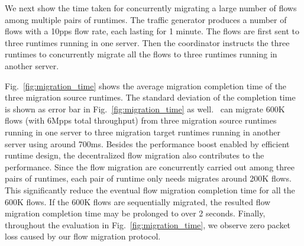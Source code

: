 We next show the time taken for concurrently migrating a large number of flows among multiple pairs of runtimes. The traffic generator produces a number of flows with a 10pps flow rate, each lasting for 1 minute. The flows are first sent to three runtimes running in one server. Then the coordinator instructs the three runtimes to concurrently migrate all the flows to three runtimes running in another server. %

Fig.~\ref{fig:migration_time} shows the average migration completion time of the three migration source runtimes. The standard deviation of the completion time is shown as error bar in Fig.~\ref{fig:migration_time} as well. \nfactor~can migrate 600K flows (with 6Mpps total throughput) from three migration source runtimes running in one server to three migration target runtimes running in another server using around 700ms. Besides the performance boost enabled by efficient runtime design, the decentralized flow migration also contributes to the performance. Since the flow migration are concurrently carried out among three pairs of runtimes, each pair of runtime only needs migrates around 200K flows. This significantly reduce the eventual flow migration completion time for all the 600K flows. If the 600K flows are sequentially migrated, the resulted flow migration completion time may be prolonged to over 2 seconds. Finally, throughout the evaluation in Fig.~\ref{fig:migration_time}, we observe zero packet loss caused by our flow migration protocol.


